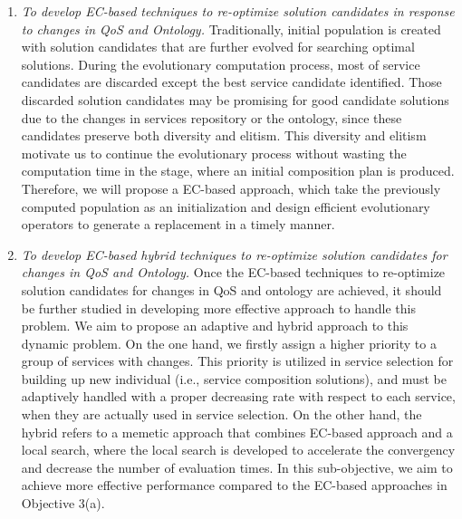 \begin{enumerate}
  \begin{enumerate}
 \item \label{Obj:3.1} \emph{To develop EC-based techniques to re-optimize solution candidates in response to changes in QoS and Ontology.} Traditionally, initial population is created with solution candidates that are further evolved for searching optimal solutions. During the evolutionary computation process, most of service candidates are discarded except the best service candidate identified. Those discarded solution candidates may be promising for good candidate solutions due to the changes in services repository or the ontology, since these candidates preserve both diversity and elitism. This diversity and elitism motivate us to continue the evolutionary process without wasting the computation time in the stage, where an initial composition plan is produced. Therefore, we will propose a EC-based approach, which take the previously computed population as an initialization and design efficient evolutionary operators to generate a replacement in a timely manner.  
 
 \item \emph{To develop EC-based hybrid techniques to re-optimize solution candidates for changes in QoS and Ontology.} Once the EC-based techniques to re-optimize solution candidates for changes in QoS and ontology are achieved, it should be further studied in developing more effective approach to handle this problem. We aim to propose an adaptive and hybrid approach to this dynamic problem. On the one hand, we firstly assign a higher priority to a group of services with changes. This priority is utilized in service selection for building up new individual (i.e., service composition solutions), and must be adaptively handled with a proper decreasing rate with respect to each service, when they are actually used in service selection. On the other hand, the hybrid refers to a memetic approach that combines EC-based approach and a local search, where the local search is developed to accelerate the convergency and decrease the number of evaluation times. In this sub-objective, we aim to achieve more effective performance compared to the EC-based approaches in Objective 3(a).
 

\end{enumerate}
\end{enumerate}
